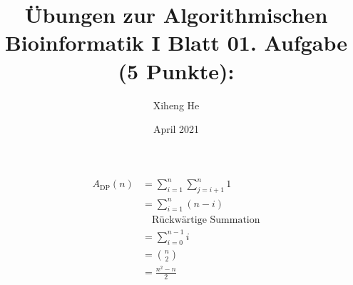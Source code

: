\documentclass{article}
\title{Übungen zur Algorithmischen Bioinformatik I
Blatt 0}
\author{Xiheng He }
\date{April 2021}
\begin{document}
\maketitle
\title{1. Aufgabe (5 Punkte):}
	\begin{equation*}
	    \begin{aligned}
			A_{\text{DP}}(n) &= \sum_{i=1}^{n}\sum_{j=i+1}^{n}1\\
	                   &= \sum_{i=1}^{n}(n-i)\\
	                   &\quad\text{Rückwärtige Summation}\\
	                   &= \sum_{i=0}^{n-1}i\\
	                   &= \binom{n}{2}\\
	                   &= \frac{n^{2}-n}{2}
	    \end{aligned}
	\end{equation*}
\end{document}
